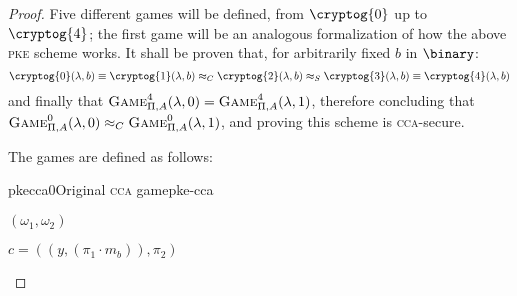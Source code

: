 \begin{proof}
    Five different games will be defined, from $\cryptog{0}$ up to $\cryptog{4}$; the first game will be an analogous formalization of how the above \textsc{pke} scheme works. It shall be proven that, for arbitrarily fixed $b$ in $\binary$:
    \[
        \cryptog{0}(\lambda, b) \equiv \cryptog{1}(\lambda, b) \approx_C \cryptog{2}(\lambda, b) \approx_S \cryptog{3}(\lambda, b) \equiv \cryptog{4}(\lambda, b)
    \]
    and finally that $\textsc{Game}_{\Pi, A}^4(\lambda, 0) = \textsc{Game}_{\Pi, A}^4(\lambda, 1)$, therefore concluding that $\textsc{Game}_{\Pi, A}^0(\lambda, 0) \approx_C \textsc{Game}_{\Pi, A}^0(\lambda, 1)$, and proving this scheme is \textsc{cca}-secure.


    The games are defined as follows:

    \begin{cryptogame}{pkecca0}{Original \textsc{cca} game}{pke-cca}
    
        {$(\omega_1, \omega_2)$}
        {}
    
        \send{}{}{}
        \receive{}{}{}
    
        \cseqdelay
    
        {$c = ((y, (\pi_1 \cdot m_b)), \pi_2)$}
        {}
    
        \cseqdelay
    
        \send{}{}{}
        \receive{}{}{}
    
        \cseqdelay
    
    

\end{cryptogame}
\end{proof}
